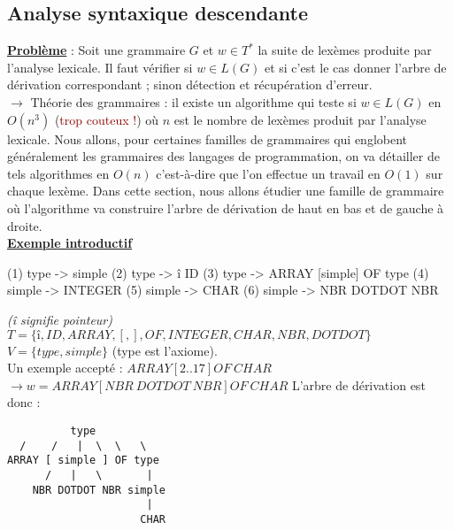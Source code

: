 \documentclass{article}
\newcommand{\red}[1]{\textcolor{darkred}{#1}}
\newcommand{\stitre}[1]{\noindent\textbf{\underline{#1}}}
\begin{document}
\subsection{Analyse syntaxique descendante}

\stitre{Problème} : Soit une grammaire $G$ et  $w \in T^*$ la suite  de lexèmes produite par l'analyse lexicale. Il faut vérifier si $w \in L(G)$ et si c'est le cas donner l'arbre de 
dérivation correspondant ; sinon détection et récupération d'erreur. \\
$\rightarrow$ Théorie des grammaires : il existe un algorithme qui teste si $w \in L(G)$ en $O(n^3)$ (\red{trop couteux !}) où $n$ est le nombre de lexèmes produit par l'analyse 
lexicale. Nous allons, pour certaines familles de grammaires qui englobent généralement les grammaires des langages de programmation, on va détailler de tels algorithmes en 
$O(n)$ c'est-à-dire que l'on effectue un travail en $O(1)$ sur chaque lexème. Dans cette section, nous allons étudier une famille de grammaire où l'algorithme va construire 
l'arbre de dérivation de haut en bas et de gauche à droite. \\

\stitre{Exemple introductif}

\begin{center}
	\begin{boxedverbatim}
(1) type -> simple	
(2) type -> î ID
(3) type -> ARRAY [simple] OF type
(4) simple -> INTEGER
(5) simple -> CHAR
(6) simple -> NBR DOTDOT NBR
	\end{boxedverbatim}
\end{center}
\textit{(î signifie pointeur)} \\
$T =\{ \text{î}, ID, ARRAY,[,],OF,INTEGER,CHAR,NBR,DOTDOT\}$\\
$V=\{type,simple\}$ (type est l'axiome).\\
Un exemple accepté : $ARRAY [2..17] OF\ CHAR$ \\
$\rightarrow w = ARRAY [NBR\ DOTDOT\ NBR ] OF\ CHAR$
L'arbre de dérivation est donc : 
\begin{verbatim}
          type
  /    /   |  \  \   \
ARRAY [ simple ] OF type
      /   |   \       |
    NBR DOTDOT NBR simple
                      |
                     CHAR
\end{verbatim}
\end{document}
